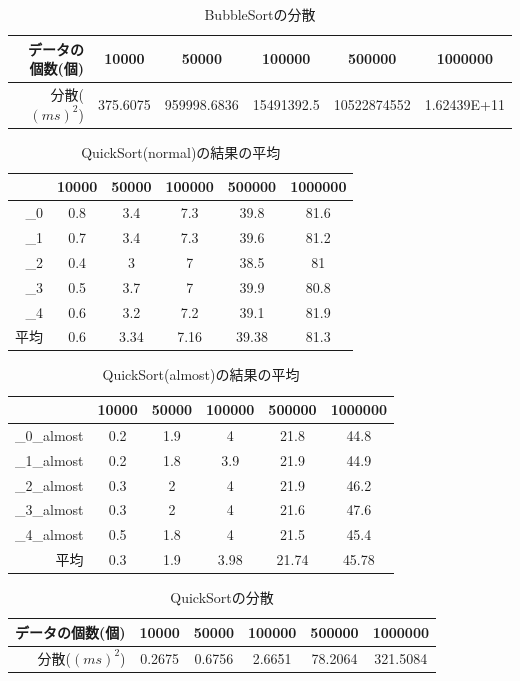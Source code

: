 \documentclass[a4j,dvipdfmx]{jsreport}
\begin{document}
\begin{table}[hbtp]
\caption{BubbleSortの分散}
\label{table:data_type}
\centering
\begin{tabular}{|r||ccccc|}
\hline
データの個数(個) & 10000 & 50000 & 100000 & 500000 & 1000000 \\ \hline
分散($(ms)^2$) & 375.6075 & 959998.6836 & 15491392.5 & 10522874552 & 1.62439E+11 \\
\hline
\end{tabular}
\end{table}

\begin{table}[hbtp]
\caption{QuickSort(normal)の結果の平均}
\label{table:data_type}
\centering
\begin{tabular}{|r||ccccc|}
\hline
 & 10000 & 50000 & 100000 & 500000 & 1000000 \\ \hline
\_0 & 0.8 & 3.4 & 7.3 & 39.8 & 81.6 \\
\_1 & 0.7 & 3.4 & 7.3 & 39.6 & 81.2 \\
\_2 & 0.4 & 3 & 7 & 38.5 & 81 \\
\_3 & 0.5 & 3.7 & 7 & 39.9 & 80.8 \\
\_4 & 0.6 & 3.2 & 7.2 & 39.1 & 81.9 \\ \hline
平均 & 0.6 & 3.34 & 7.16 & 39.38 & 81.3 \\
\hline
\end{tabular}
\end{table}

\begin{table}[hbtp]
\caption{QuickSort(almost)の結果の平均}
\label{table:data_type}
\centering
\begin{tabular}{|r||ccccc|}
\hline
 & 10000 & 50000 & 100000 & 500000 & 1000000 \\ \hline
\_0\_almost & 0.2 & 1.9 & 4 & 21.8 & 44.8 \\
\_1\_almost & 0.2 & 1.8 & 3.9 & 21.9 & 44.9 \\
\_2\_almost & 0.3 & 2 & 4 & 21.9 & 46.2 \\
\_3\_almost & 0.3 & 2 & 4 & 21.6 & 47.6 \\
\_4\_almost & 0.5 & 1.8 & 4 & 21.5 & 45.4 \\ \hline
平均 & 0.3 & 1.9 & 3.98 & 21.74 & 45.78 \\
\hline
\end{tabular}
\end{table}

\begin{table}[hbtp]
\caption{QuickSortの分散}
\label{table:data_type}
\centering
\begin{tabular}{|r||ccccc|}
\hline
データの個数(個) & 10000 & 50000 & 100000 & 500000 & 1000000 \\ \hline
分散($(ms)^2$) & 0.2675 & 0.6756 & 2.6651 & 78.2064 & 321.5084 \\
\hline
\end{tabular}
\end{table}
\end{document}
